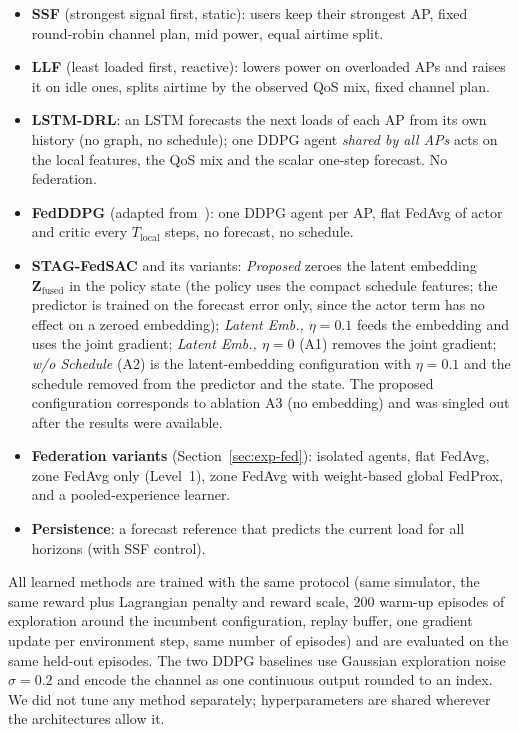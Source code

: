 \begin{itemize}
  \item \textbf{SSF} (strongest signal first, static): users keep their strongest AP, fixed round-robin channel plan, mid power, equal airtime split.
  \item \textbf{LLF} (least loaded first, reactive): lowers power on overloaded APs and raises it on idle ones, splits airtime by the observed QoS mix, fixed channel plan.
  \item \textbf{LSTM-DRL}: an LSTM forecasts the next loads of each AP from its own history (no graph, no schedule); one DDPG agent \emph{shared by all APs} acts on the local features, the QoS mix and the scalar one-step forecast. No federation.
  \item \textbf{FedDDPG} (adapted from~\cite{du2024}): one DDPG agent per AP, flat FedAvg of actor and critic every $T_{\mathrm{local}}$ steps, no forecast, no schedule.
  \item \textbf{STAG-FedSAC} and its variants: \emph{Proposed} zeroes the latent embedding $\mathbf{Z}_{\mathrm{fused}}$ in the policy state (the policy uses the compact schedule features; the predictor is trained on the forecast error only, since the actor term has no effect on a zeroed embedding); \emph{Latent Emb., $\eta{=}0.1$} feeds the embedding and uses the joint gradient; \emph{Latent Emb., $\eta{=}0$} (A1) removes the joint gradient; \emph{w/o Schedule} (A2) is the latent-embedding configuration with $\eta=0.1$ and the schedule removed from the predictor and the state. The proposed configuration corresponds to ablation A3 (no embedding) and was singled out after the results were available.
  \item \textbf{Federation variants} (Section~\ref{sec:exp-fed}): isolated agents, flat FedAvg, zone FedAvg only (Level~1), zone FedAvg with weight-based global FedProx, and a pooled-experience learner.
  \item \textbf{Persistence}: a forecast reference that predicts the current load for all horizons (with SSF control).
\end{itemize}
All learned methods are trained with the same protocol (same simulator, the same reward plus Lagrangian penalty and reward scale, 200 warm-up episodes of exploration around the incumbent configuration, replay buffer, one gradient update per environment step, same number of episodes) and are evaluated on the same held-out episodes. The two DDPG baselines use Gaussian exploration noise $\sigma=0.2$ and encode the channel as one continuous output rounded to an index. We did not tune any method separately; hyperparameters are shared wherever the architectures allow it.

